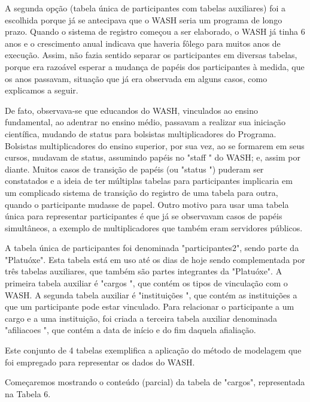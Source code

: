 A segunda opção (tabela única de participantes com tabelas auxiliares) foi a escolhida porque já se antecipava que o WASH seria um programa de longo prazo. Quando o sistema de registro começou a ser elaborado, o WASH já tinha 6 anos e o crescimento anual indicava que haveria fôlego para muitos anos de execução. Assim, não fazia sentido separar os participantes em diversas tabelas, porque era razoável esperar a mudança de papéis dos participantes à medida, que os anos passavam, situação que já era observada em alguns casos, como explicamos a seguir.

De fato, observava-se que educandos do WASH, vinculados ao ensino fundamental, ao adentrar no ensino médio, passavam a realizar sua iniciação científica, mudando de status para bolsistas multiplicadores do Programa. Bolsistas multiplicadores do ensino superior, por sua vez, ao se formarem em seus cursos, mudavam de status, assumindo papéis no  "staff " do WASH; e, assim por diante. Muitos casos de transição de papéis (ou "status ") puderam ser constatados e a ideia de ter múltiplas tabelas para participantes implicaria em um complicado sistema de transição do registro de uma tabela para outra, quando o participante mudasse de papel. Outro motivo para usar uma tabela única para representar participantes é que já se observavam casos de papéis simultâneos, a exemplo de multiplicadores que também eram servidores públicos.

A tabela única de participantes foi denominada "participantes2", sendo parte da  "Platuóxe". Esta tabela está em uso até os dias de hoje sendo complementada por três tabelas auxiliares, que também são partes integrantes da "Platuóxe". A primeira tabela auxiliar é "cargos ", que contém os tipos de vinculação com o WASH. A segunda tabela auxiliar é "instituições ", que contém as instituições a que um participante pode estar vinculado. Para relacionar o participante a um cargo e a uma instituição, foi criada a terceira tabela auxiliar denominada "afiliacoes ", que contém a data de início e do fim daquela afialiação.

Este conjunto de 4 tabelas exemplifica a aplicação do método de modelagem que foi empregado para representar os dados do WASH.

Começaremos mostrando o conteúdo (parcial) da tabela de "cargos", representada na Tabela 6.





